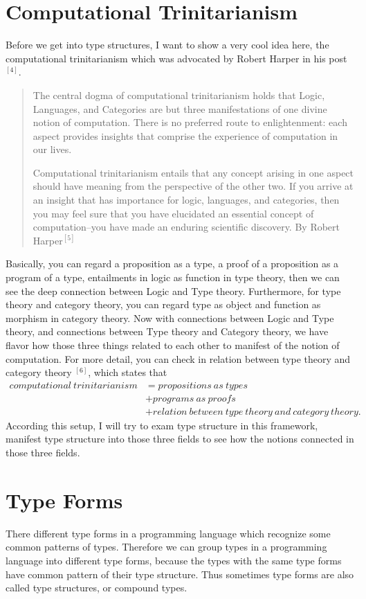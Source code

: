 \documentclass{article}
\begin{document}
\section{Computational Trinitarianism}


Before we get into type structures, I want to show a very cool idea here, the computational trinitarianism which was advocated by Robert Harper in his post$^{[4]}$. 
\begin{quote}
The central dogma of computational trinitarianism holds that Logic, Languages, and Categories are but three manifestations of one divine notion of computation. There is no preferred route to enlightenment: each aspect provides insights that comprise the experience of computation in our lives.


Computational trinitarianism entails that any concept arising in one aspect should have meaning from the perspective of the other two. If you arrive at an insight that has importance for logic, languages, and categories, then you may feel sure that you have elucidated an essential concept of computation–you have made an enduring scientific discovery. By Robert Harper$^{[5]}$
\end{quote}


Basically, you can regard a proposition as a type, a proof of a proposition as a program of a type, entailments in logic as function in type theory, then we can see the deep connection between Logic and Type theory. Furthermore, for type theory and category theory, you can regard type as object and function as morphism in category theory. Now with connections between Logic and Type theory, and connections between Type theory and Category theory, we have flavor how those three things related to each other to manifest of the notion of computation. For more detail, you can check in relation between type theory and category theory $^{[6]}$, which states that 
\begin{align*}
computational\:trinitarianism &= propositions\ as\ types\\
&+ programs\ as\ proofs\\
&+ relation\ between\ type\ theory\ and\ category\ theory.
\end{align*}
	According this setup, I will try to exam type structure in this framework, manifest type structure into those three fields to see how the notions connected in those three fields.

\section{Type Forms}
There different type forms in a programming language which recognize some common patterns of types. Therefore we can group types in a programming language into different type forms, because the types with the same type forms have common pattern of their type structure. Thus sometimes type forms are also called type structures, or compound types.
\end{document}
